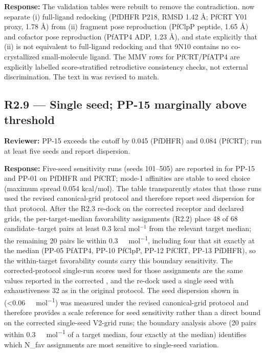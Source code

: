 \documentclass[11pt]{article}
\begin{document}
\textbf{Response:} The validation tables were rebuilt to remove the contradiction.
 now separate (i) full-ligand redocking (PfDHFR P218, RMSD 1.42 \AA; PfCRT Y01 proxy,
1.78 \AA) from (ii) fragment pose reproduction (PfClpP peptide, 1.65 \AA) and cofactor pose
reproduction (PfATP4 ADP, 1.23 \AA), and state explicitly that (ii) is not equivalent to
full-ligand redocking and that 9N10 contains no co-crystallized small-molecule ligand. The MMV
rows for PfCRT/PfATP4 are explicitly labelled score-stratified retrodictive consistency checks,
not external discrimination. The text in  was revised to match.

\subsection*{R2.9 --- Single seed; PP-15 marginally above threshold}
\textbf{Reviewer:} PP-15 exceeds the cutoff by 0.045 (PfDHFR) and 0.084 (PfCRT); run at least
five seeds and report dispersion.

\textbf{Response:} Five-seed sensitivity runs (seeds 101--505) are reported in 
for PP-15 and PP-01 on PfDHFR and PfCRT; mode-1 affinities are stable to seed choice
(maximum spread 0.054 kcal/mol). The table transparently states that those runs used the
revised canonical-grid protocol and therefore report seed dispersion for that protocol. After the
R2.3 re-dock on the corrected receptor and declared grids, the per-target-median
favorability assignments (R2.2) place 48 of 68 candidate--target pairs at least
0.3 kcal mol$^{-1}$ from the relevant target median; the remaining 20 pairs lie within
\qty{0.3}{\kilo\calorie\per\mole}, including four that sit exactly at the median (PP-05 PfATP4, PP-10
PfClpP, PP-12 PfCRT, PP-13 PfDHFR), so the within-target favorability counts carry
this boundary sensitivity. The corrected-protocol single-run scores used for those assignments
are the same values reported in the corrected , and the re-dock used a single seed
with exhaustiveness \num{32} as in the original protocol. The seed dispersion shown in 
(\qty{<0.06}{\kilo\calorie\per\mole}) was measured under the revised canonical-grid protocol and therefore
provides a scale reference for seed sensitivity rather than a direct bound on the corrected
single-seed V2-grid runs; the boundary analysis above (\num{20} pairs within \qty{0.3}{\kilo\calorie\per\mole} of a
target median, four exactly at the median) identifies which N\_fav assignments are most
sensitive to single-seed variation.
\end{document}

